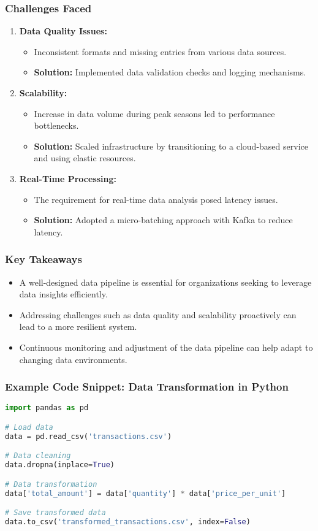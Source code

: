 \documentclass{beamer}
\begin{document}
\begin{frame}
    \frametitle{Challenges Faced}
    \begin{enumerate}
        \item \textbf{Data Quality Issues:}
            \begin{itemize}
                \item Inconsistent formats and missing entries from various data sources.
                \item \textbf{Solution:} Implemented data validation checks and logging mechanisms.
            \end{itemize}
        \item \textbf{Scalability:}
            \begin{itemize}
                \item Increase in data volume during peak seasons led to performance bottlenecks.
                \item \textbf{Solution:} Scaled infrastructure by transitioning to a cloud-based service and using elastic resources.
            \end{itemize}
        \item \textbf{Real-Time Processing:}
            \begin{itemize}
                \item The requirement for real-time data analysis posed latency issues.
                \item \textbf{Solution:} Adopted a micro-batching approach with Kafka to reduce latency.
            \end{itemize}
    \end{enumerate}
\end{frame}

\begin{frame}
    \frametitle{Key Takeaways}
    \begin{itemize}
        \item A well-designed data pipeline is essential for organizations seeking to leverage data insights efficiently.
        \item Addressing challenges such as data quality and scalability proactively can lead to a more resilient system.
        \item Continuous monitoring and adjustment of the data pipeline can help adapt to changing data environments.
    \end{itemize}
\end{frame}

\begin{frame}[fragile]
    \frametitle{Example Code Snippet: Data Transformation in Python}
    \begin{lstlisting}[language=Python]
import pandas as pd

# Load data
data = pd.read_csv('transactions.csv')

# Data cleaning
data.dropna(inplace=True)

# Data transformation
data['total_amount'] = data['quantity'] * data['price_per_unit']

# Save transformed data
data.to_csv('transformed_transactions.csv', index=False)
    \end{lstlisting}
\end{frame}
\end{document}
